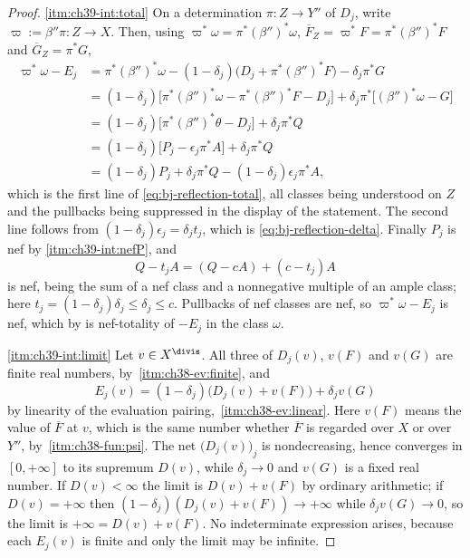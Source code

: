 \begin{proof}
\cref{itm:ch39-int:total}  On a determination $\pi:Z\to Y''$ of $D_j$,
write $\varpi:=\beta''\pi:Z\to X$.  Then, using
$\varpi^*\omega=\pi^*(\beta'')^*\omega$,
$\overline F_Z=\varpi^*F=\pi^*(\beta'')^*F$ and
$\overline G_Z=\pi^*G$,
\[
 \begin{aligned}
 \varpi^*\omega-E_j
 &=\pi^*(\beta'')^*\omega
   -(1-\delta_j)\bigl(D_j+\pi^*(\beta'')^*F\bigr)-\delta_j\pi^*G\\
 &=(1-\delta_j)\bigl[\pi^*(\beta'')^*\omega-\pi^*(\beta'')^*F-D_j\bigr]
   +\delta_j\pi^*\bigl[(\beta'')^*\omega-G\bigr]\\
 &=(1-\delta_j)\bigl[\pi^*(\beta'')^*\theta-D_j\bigr]+\delta_j\pi^*Q\\
 &=(1-\delta_j)\bigl[P_j-\epsilon_j\pi^*A\bigr]+\delta_j\pi^*Q\\
 &=(1-\delta_j)P_j+\delta_j\pi^*Q-(1-\delta_j)\epsilon_j\pi^*A,
 \end{aligned}
\]
which is the first line of \eqref{eq:bj-reflection-total}, all classes being
understood on $Z$ and the pullbacks being suppressed in the display of the
statement.  The second line follows from
$(1-\delta_j)\epsilon_j=\delta_jt_j$, which is
\eqref{eq:bj-reflection-delta}.  Finally $P_j$ is nef by
\cref{itm:ch39-int:nefP}, and
\[
 Q-t_jA=(Q-cA)+(c-t_j)A
\]
is nef, being the sum of a nef class and a nonnegative multiple of an ample
class; here $t_j=(1-\delta_j)\delta_j\le\delta_j\le c$.  Pullbacks of nef
classes are nef, so $\varpi^*\omega-E_j$ is nef, which by
 is nef-totality of $-E_j$ in the class
$\omega$.

\cref{itm:ch39-int:limit}  Let $v\in X^{\divis}$.  All three of
$D_j(v)$, $v(F)$ and $v(G)$ are finite real numbers, by
\,\cref{itm:ch38-ev:finite}, and
\[
 E_j(v)=(1-\delta_j)\bigl(D_j(v)+v(F)\bigr)+\delta_jv(G)
\]
by linearity of the evaluation pairing,
\,\cref{itm:ch38-ev:linear}.  Here
$v(F)$ means the value of $\overline F$ at $v$, which is the same
number whether $\overline F$ is regarded over $X$ or over $Y''$, by
\,\cref{itm:ch38-fun:psi}.  The net
$\bigl(D_j(v)\bigr)_j$ is nondecreasing, hence converges in
$[0,+\infty]$ to its supremum $D(v)$, while $\delta_j\to0$ and
$v(G)$ is a fixed real number.  If $D(v)<\infty$ the limit is
$D(v)+v(F)$ by ordinary arithmetic; if $D(v)=+\infty$ then
$(1-\delta_j)(D_j(v)+v(F))\to+\infty$ while $\delta_jv(G)\to0$, so the
limit is $+\infty=D(v)+v(F)$.  No indeterminate expression arises, because
each $E_j(v)$ is finite and only the limit may be infinite.
\end{proof}

